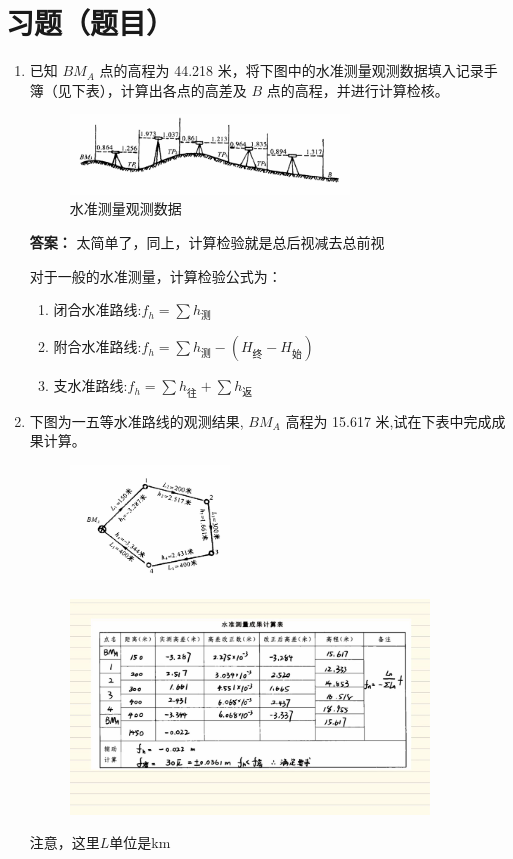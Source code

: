 \documentclass[12pt,a4paper]{article}
\newcounter{question}
\newenvironment{questions}{
    \setcounter{question}{0}
    \section*{习题（题目）}
    \begin{enumerate}[leftmargin=1.5em,label={\arabic*．}]
}{
    \end{enumerate}
}
\newcommand{\answer}[1]{\par\noindent\textbf{答案：} #1\par\vspace{1em}}
\begin{document}
\begin{questions}
(2) 仪器竖轴 VV// 圆水准器轴 L'L'

(3) 十字丝横丝 ⊥ 仪器竖轴（十字丝横丝应水平）

    \item 已知 \( BM_A \) 点的高程为 44.218 米，将下图中的水准测量观测数据填入记录手簿（见下表），计算出各点的高差及 \( B \) 点的高程，并进行计算检核。
    \begin{figure}[H]
        \centering
        \includegraphics[width = 0.7\textwidth]{./figures/2.png}
        \caption{水准测量观测数据}
    \end{figure}
    \answer{太简单了，同上，计算检验就是总后视减去总前视}
    对于一般的水准测量，计算检验公式为：
    \begin{enumerate}
    \item 闭合水准路线:$f_h = \sum h_{\text{测}}$
    \item 附合水准路线:$f_h = \sum h_{\text{测}} - (H_{\text{终}} - H_{\text{始}})$
    \item 支水准路线:$f_h = \sum h_{\text{往}} + \sum h_{\text{返}}$
\end{enumerate}

    \item 下图为一五等水准路线的观测结果, $BM_A$ 高程为 15.617 米,试在下表中完成成果计算。
    \begin{figure}[H]
        \centering
        \includegraphics[width = 0.4\textwidth]{./figures/5.png}
    \end{figure}

    \begin{figure}[H]
        \centering
        \includegraphics[width = 0.9\textwidth]{./figures/6.jpg}
    \end{figure}
    {\color{red}注意，这里$L$单位是km}
\end{questions}
\end{document}
